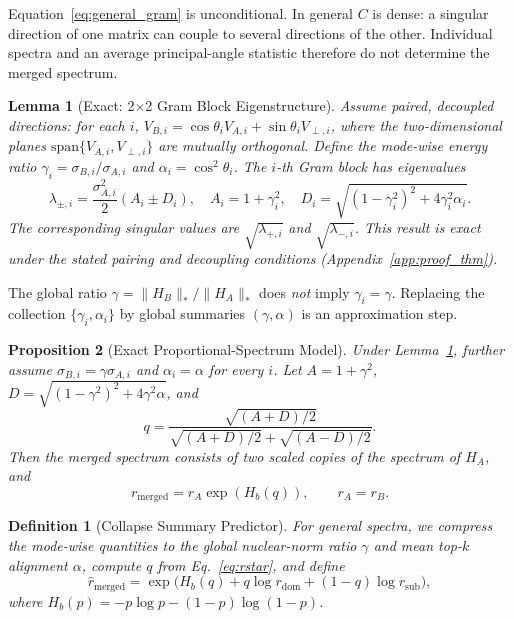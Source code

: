 \documentclass{article}
\newtheorem{lemma}{Lemma}
\newtheorem{proposition}[lemma]{Proposition}
\newtheorem{definition}{Definition}
\begin{document}
Equation~\eqref{eq:general_gram} is unconditional.  In general $C$ is
dense: a singular direction of one matrix can couple to several directions
of the other.  Individual spectra and an average principal-angle statistic
therefore do not determine the merged spectrum.

\begin{lemma}[Exact: 2$\times$2 Gram Block Eigenstructure]
\label{lem:gram}
Assume paired, decoupled directions: for each $i$,
$V_{B,i}=\cos\theta_i V_{A,i}+\sin\theta_i V_{\perp,i}$, where the
two-dimensional planes $\mathrm{span}\{V_{A,i},V_{\perp,i}\}$ are mutually
orthogonal.  Define the \emph{mode-wise} energy ratio
$\gamma_i=\sigma_{B,i}/\sigma_{A,i}$ and
$\alpha_i=\cos^2\theta_i$.  The $i$-th Gram block has eigenvalues
\begin{equation}
 \lambda_{\pm,i}=\frac{\sigma_{A,i}^2}{2}
 \left(A_i\pm D_i\right),\quad
 A_i=1+\gamma_i^2,\quad
 D_i=\sqrt{(1-\gamma_i^2)^2+4\gamma_i^2\alpha_i}.
  \label{eq:discriminant}
\end{equation}
The corresponding singular values are $\sqrt{\lambda_{+,i}}$ and
$\sqrt{\lambda_{-,i}}$.  This result is exact under the stated pairing and
decoupling conditions (Appendix~\ref{app:proof_thm}).
\end{lemma}

The global ratio $\gamma=\|H_B\|_*/\|H_A\|_*$ does \emph{not} imply
$\gamma_i=\gamma$.  Replacing the collection $\{\gamma_i,\alpha_i\}$ by
global summaries $(\gamma,\alpha)$ is an approximation step.

\begin{proposition}[Exact Proportional-Spectrum Model]
\label{prop:proportional}
Under Lemma~\ref{lem:gram}, further assume
$\sigma_{B,i}=\gamma\sigma_{A,i}$ and $\alpha_i=\alpha$ for every $i$.
Let $A=1+\gamma^2$, $D=\sqrt{(1-\gamma^2)^2+4\gamma^2\alpha}$, and
\begin{equation}
 q = \frac{\sqrt{(A+D)/2}}
 {\sqrt{(A+D)/2}+\sqrt{(A-D)/2}}.
  \label{eq:rstar}
\end{equation}
Then the merged spectrum consists of two scaled copies of the spectrum of
$H_A$, and
\begin{equation}
 r_{\mathrm{merged}}=r_A\exp(H_b(q)),\qquad r_A=r_B.
 \label{eq:proportional_exact}
\end{equation}
\end{proposition}

\begin{definition}[Collapse Summary Predictor]
\label{def:collapse}
For general spectra, we compress the mode-wise quantities to the global
nuclear-norm ratio $\gamma$ and mean top-$k$ alignment $\alpha$, compute
$q$ from Eq.~\eqref{eq:rstar}, and define
\begin{equation}
  \hat{r}_{\mathrm{merged}} =
  \exp\!\Big(H_b(q) + q\log r_{\mathrm{dom}} + (1-q)\log r_{\mathrm{sub}}\Big),
  \label{eq:pred}
\end{equation}
where $H_b(p)=-p\log p-(1-p)\log(1-p)$.
\end{definition}
\end{document}
